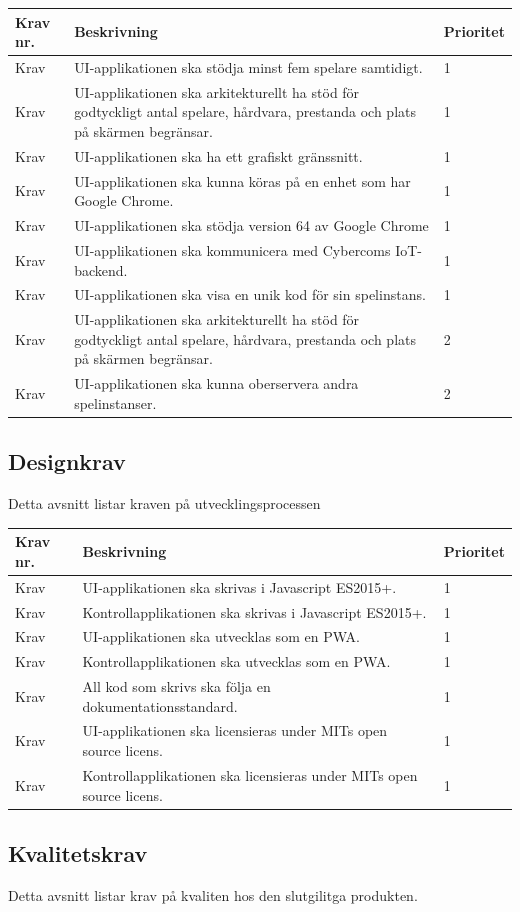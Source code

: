 \documentclass[10pt]{article}
\newcounter{indexcounter}
\newcommand{\Krav}[2]{
	\stepcounter{indexcounter}
	Krav \arabic{indexcounter} & #1 & #2 \\ \hline
}
\begin{document}
	\begin{tabular}{| p{2cm} | p{8cm} | p{2cm}|}
		\hline
		
		\textbf{Krav nr.} & \textbf{Beskrivning} &\textbf{Prioritet} \\ \hline
		\Krav{UI-applikationen ska stödja minst fem spelare samtidigt.}{1}
        \Krav{UI-applikationen ska arkitekturellt ha stöd för godtyckligt antal spelare, hårdvara, prestanda och plats
		på skärmen begränsar.}{1}
		\Krav{UI-applikationen ska ha ett grafiskt gränssnitt.}{1}
		\Krav{UI-applikationen ska kunna köras på en enhet som har Google Chrome.}{1}
		\Krav{UI-applikationen ska stödja version 64 av Google Chrome}{1}
		\Krav{UI-applikationen ska kommunicera med Cybercoms IoT-backend.}{1}
		\Krav{UI-applikationen ska visa en unik kod för sin spelinstans.}{1}
		\Krav{UI-applikationen ska arkitekturellt ha stöd för godtyckligt antal spelare, hårdvara, prestanda och plats på skärmen begränsar.}{2}
		\Krav{UI-applikationen ska kunna oberservera andra spelinstanser.}{2}
						
	\end{tabular}
	
	\subsection{Designkrav}
	Detta avsnitt listar kraven på utvecklingsprocessen
	
	\begin{tabular}{| p{2cm} | p{8cm} | p{2cm}|}
		\hline
		\textbf{Krav nr.} & \textbf{Beskrivning} & \textbf{Prioritet} \\ \hline
		
		\Krav{UI-applikationen ska skrivas i Javascript ES2015+.}{1}
		\Krav{Kontrollapplikationen ska skrivas i Javascript ES2015+.}{1}
		\Krav{UI-applikationen ska utvecklas som en PWA.}{1}
		\Krav{Kontrollapplikationen ska utvecklas som en PWA.}{1}
		\Krav{All kod som skrivs ska följa en dokumentationsstandard.}{1}
		\Krav{UI-applikationen ska licensieras under MITs open source licens.}{1}
		\Krav{Kontrollapplikationen ska licensieras under MITs open source licens.}{1}
		
	\end{tabular}

	\subsection{Kvalitetskrav}
	Detta avsnitt listar krav på kvaliten hos den slutgilitga produkten.
	
\end{document}
